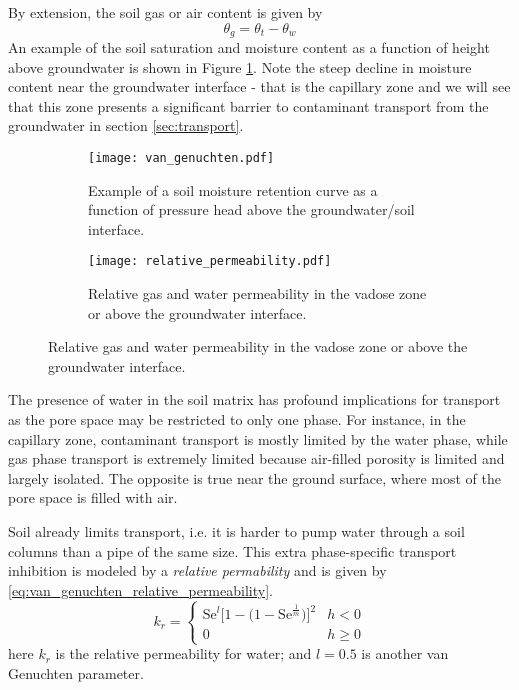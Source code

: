 By extension, the soil gas or air content is given by
\begin{equation}\label{eq:gas_porosity}
  \theta_g = \theta_t - \theta_w
\end{equation}
An example of the soil saturation and moisture content as a function of height above groundwater is shown in Figure \ref{fig:retention_curve}.
Note the steep decline in moisture content near the groundwater interface - that is the capillary zone and we will see that this zone presents a significant barrier to contaminant transport from the groundwater in section \ref{sec:transport}.\par

\begin{figure}
  \centering
  \begin{subfigure}[t]{0.49\textwidth}
    \texttt{[image: van\_genuchten.pdf]}
    \caption{Example of a soil moisture retention curve as a function of pressure head above the groundwater/soil interface.}
    \label{fig:retention_curve}
  \end{subfigure}
  \begin{subfigure}[t]{0.49\textwidth}
    \texttt{[image: relative\_permeability.pdf]}
    \caption{Relative gas and water permeability in the vadose zone or above the groundwater interface.}
    \label{fig:relative_permeability}
  \end{subfigure}
\end{figure}

The presence of water in the soil matrix has profound implications for transport as the pore space may be restricted to only one phase.
For instance, in the capillary zone, contaminant transport is mostly limited by the water phase, while gas phase transport is extremely limited because air-filled porosity is limited and largely isolated.
The opposite is true near the ground surface, where most of the pore space is filled with air.\par

Soil already limits transport, i.e. it is harder to pump water through a soil columns than a pipe of the same size.
This extra phase-specific transport inhibition is modeled by a \textit{relative permability} and is given by \eqref{eq:van_genuchten_relative_permeability}.
\begin{equation}\label{eq:van_genuchten_relative_permeability}
  k_r =
    \begin{cases}
      \mathrm{Se}^l \big[ 1 - \big( 1 - \mathrm{Se}^\frac{1}{m} \big) \big]^2 & h < 0 \\
      0 & h \geq 0
    \end{cases}
\end{equation}
here $k_r$ is the relative permeability for water; %
and $l = 0.5$ is another van Genuchten parameter.\par %

